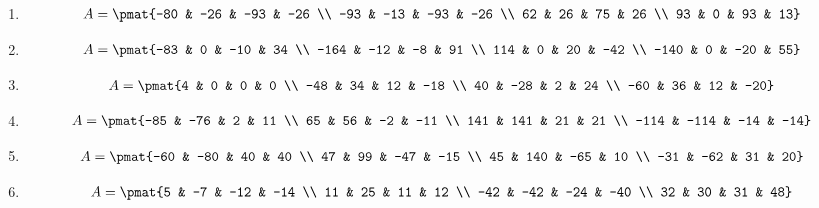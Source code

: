 \begin{enumerate}
\item

\begin{align*}
A = \pmat{-80 & -26 & -93 & -26 \\ -93 & -13 & -93 & -26 \\ 62 & 26 & 75 & 26 \\ 93 & 0 & 93 & 13}
\end{align*}

\item

\begin{align*}
A = \pmat{-83 & 0 & -10 & 34 \\ -164 & -12 & -8 & 91 \\ 114 & 0 & 20 & -42 \\ -140 & 0 & -20 & 55}
\end{align*}

\item

\begin{align*}
A = \pmat{4 & 0 & 0 & 0 \\ -48 & 34 & 12 & -18 \\ 40 & -28 & 2 & 24 \\ -60 & 36 & 12 & -20}
\end{align*}

\item

\begin{align*}
A = \pmat{-85 & -76 & 2 & 11 \\ 65 & 56 & -2 & -11 \\ 141 & 141 & 21 & 21 \\ -114 & -114 & -14 & -14}
\end{align*}

\item

\begin{align*}
A = \pmat{-60 & -80 & 40 & 40 \\ 47 & 99 & -47 & -15 \\ 45 & 140 & -65 & 10 \\ -31 & -62 & 31 & 20}
\end{align*}

\item

\begin{align*}
A = \pmat{5 & -7 & -12 & -14 \\ 11 & 25 & 11 & 12 \\ -42 & -42 & -24 & -40 \\ 32 & 30 & 31 & 48}
\end{align*}


\end{enumerate}
